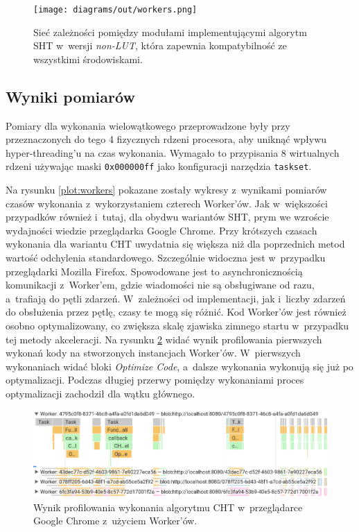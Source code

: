 \begin{figure}[h]
    \centering
    \texttt{[image: diagrams/out/workers.png]}
    \caption{Sieć zależności pomiędzy modułami implementującymi algorytm SHT w~wersji \textit{non-LUT}, która zapewnia kompatybilność ze wszystkimi środowiskami.}
    \label{fig:workers-struct}
\end{figure}

\subsection{Wyniki pomiarów}

Pomiary dla wykonania wielowątkowego przeprowadzone były przy przeznaczonych do tego 4 fizycznych rdzeni procesora, aby uniknąć wpływu hyper-threading'u na czas wykonania. Wymagało to przypisania 8 wirtualnych rdzeni używając maski \lstinline{0x000000ff} jako konfiguracji narzędzia \lstinline{taskset}.




Na rysunku \ref{plot:workers} pokazane zostały wykresy z~wynikami pomiarów czasów wykonania z~wykorzystaniem czterech Worker'ów. Jak w~większości przypadków również i~tutaj, dla obydwu wariantów SHT, prym we wzroście wydajności wiedzie przeglądarka Google Chrome. Przy krótszych czasach wykonania dla wariantu CHT uwydatnia się większa niż dla poprzednich metod wartość odchylenia standardowego. Szczególnie widoczna jest w~przypadku przeglądarki Mozilla Firefox. Spowodowane jest to asynchronicznością komunikacji z~Worker'em, gdzie wiadomości nie są obsługiwane od razu, a~trafiają do pętli zdarzeń. W~zależności od implementacji, jak i~liczby zdarzeń do obsłużenia przez pętlę, czasy te mogą się różnić. Kod Worker'ów jest również osobno optymalizowany, co zwiększa skalę zjawiska zimnego startu w~przypadku tej metody akceleracji.  Na rysunku \ref{fig:profiler-workers} widać wynik profilowania pierwszych wykonań kody na stworzonych instancjach Worker'ów. W~pierwszych wykonaniach widać bloki \textit{Optimize Code}, a~dalsze wykonania wykonują się już po optymalizacji. Podczas długiej przerwy pomiędzy wykonaniami proces optymalizacji zachodził dla wątku głównego.

\begin{figure}[h]
    \centering
    \includegraphics[width=\linewidth]{img/workers-profiler.png}
    \caption{Wynik profilowania wykonania algorytmu CHT w~przeglądarce Google Chrome z~użyciem Worker'ów.}
    \label{fig:profiler-workers}
\end{figure}

